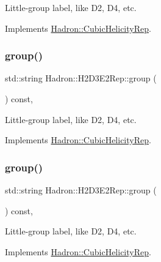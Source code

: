 Little-\/group label, like D2, D4, etc. 

Implements \mbox{\hyperlink{structHadron_1_1CubicHelicityRep_a101a7d76cd8ccdad0f272db44b766113}{Hadron\+::\+Cubic\+Helicity\+Rep}}.

\mbox{\label{structHadron_1_1H2D3E2Rep_a3a6d6bb478ae6e65c1d31ad244ab4d20}} 
\subsubsection{\texorpdfstring{group()}{group()}\hspace{0.1cm}{\footnotesize\ttfamily [3/5]}}
{\footnotesize\ttfamily std\+::string Hadron\+::\+H2\+D3\+E2\+Rep\+::group (\begin{DoxyParamCaption}{ }\end{DoxyParamCaption}) const\hspace{0.3cm}{\ttfamily [inline]}, {\ttfamily [virtual]}}

Little-\/group label, like D2, D4, etc. 

Implements \mbox{\hyperlink{structHadron_1_1CubicHelicityRep_a101a7d76cd8ccdad0f272db44b766113}{Hadron\+::\+Cubic\+Helicity\+Rep}}.

\mbox{\label{structHadron_1_1H2D3E2Rep_a3a6d6bb478ae6e65c1d31ad244ab4d20}} 
\subsubsection{\texorpdfstring{group()}{group()}\hspace{0.1cm}{\footnotesize\ttfamily [4/5]}}
{\footnotesize\ttfamily std\+::string Hadron\+::\+H2\+D3\+E2\+Rep\+::group (\begin{DoxyParamCaption}{ }\end{DoxyParamCaption}) const\hspace{0.3cm}{\ttfamily [inline]}, {\ttfamily [virtual]}}

Little-\/group label, like D2, D4, etc. 

Implements \mbox{\hyperlink{structHadron_1_1CubicHelicityRep_a101a7d76cd8ccdad0f272db44b766113}{Hadron\+::\+Cubic\+Helicity\+Rep}}.

\mbox{\label{structHadron_1_1H2D3E2Rep_a3a6d6bb478ae6e65c1d31ad244ab4d20}} 
